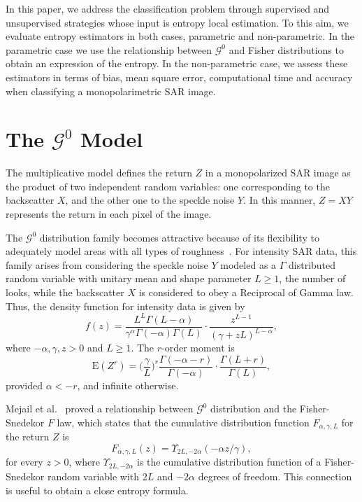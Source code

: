 \documentclass[journal]{IEEEtran}
\begin{document}
	In this paper, we address the classification problem through supervised and unsupervised strategies whose input is entropy local estimation. 
	To this aim, we evaluate entropy estimators in both cases, parametric and non-parametric. 
	In the parametric case we use the relationship between $\mathcal{G}^0$ and Fisher distributions to obtain an expression of the entropy. 
	In the non-parametric case, we assess these estimators in terms of bias, mean square error, computational time and accuracy when classifying a monopolarimetric SAR image. 
	
	\section{The $\mathcal{G}^0$ Model}
	\label{sec_SAR}
	
	The multiplicative model defines the return $Z$ in a monopolarized SAR image as the product of two independent random variables: one corresponding to the backscatter $X$, and the other one to the speckle noise $Y$.
	In this manner, $Z=X Y$ represents the return in each pixel of the image.
	
	The $\mathcal{G}^{0}$ distribution family becomes attractive because of its flexibility to adequately model areas with all types of roughness~\cite{MejailJacoboFreryBustos:IJRS,  mejailfreryjacobobustos2001}. 
	For intensity SAR data, this family arises from considering the speckle noise $Y$ modeled as a $\Gamma$ distributed random variable with unitary mean and shape parameter $L\geq1$, the number of looks, while the backscatter $X$ is considered to obey a Reciprocal of Gamma law.  
	Thus, the density function for intensity data is given by
	\begin{equation}
		f(z) =\frac{L^{L}\Gamma ( L-\alpha
			) }{\gamma ^{\alpha }\Gamma ( -\alpha ) \Gamma (
			L) }\cdot  
		\frac{z^{L-1}}{( \gamma +zL) ^{L-\alpha }},%
		\label{}
	\end{equation}
	where $-\alpha,\gamma ,z>0$ and $L\geq 1$. 
	The $r$-order moment is
	\begin{equation}
		\text{E}(Z^r) =\Big(\frac{\gamma}{L}\Big)^r\frac{\Gamma ( -\alpha-r )}{ \Gamma (-\alpha) } \cdot
		\frac{\Gamma (L+r )}{\Gamma (L)},
		\label{moments_gI0}
	\end{equation}
	provided $\alpha<-r$, and infinite otherwise.
	
	Mejail et al.~\cite{MejailJacoboFreryBustos:IJRS} proved a relationship between $\mathcal G^0$ distribution and the Fisher-Snedekor $F$ law, which states that the cumulative distribution function $F_{\alpha,\gamma,L}$ for the return $Z$ is
	\begin{equation}
		F_{\alpha,\gamma,L}(z) = \Upsilon_{2L, -2\alpha}(-\alpha  z / \gamma),
		\label{eq:CDFG0}
	\end{equation}
	for every $z>0$, where $\Upsilon_{2L, -2\alpha}$ is the cumulative distribution function of a Fisher-Snedekor random variable with $2L$ and $-2\alpha$ degrees of freedom.
	This connection is useful to obtain a close entropy formula. 
	
\end{document}

